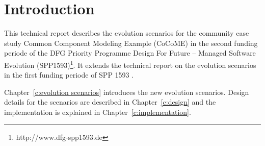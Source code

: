 \chapter{Introduction}

This technical report describes the evolution scenarios for the community case study Common Component Modeling Example (CoCoME) \cite{herold2008, heinrich2015platform} in the second funding periode of the DFG Priority Programme
Design For Future -- Managed Software Evolution (SPP1593)\footnote{http://www.dfg-spp1593.de}. 
It extends the technical report on the evolution scenarios in the first funding periode of SPP 1593 \cite{HeinrichRostamiReussner2016_1000052688}.

Chapter~\ref{c:evolution scenarios} introduces the new evolution scenarios.
Design details for the scenarios are described in Chapter~\ref{c:design} and the implementation is explained in Chapter~\ref{c:implementation}. 
